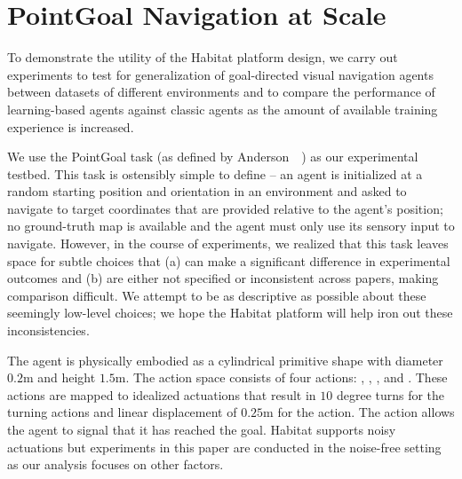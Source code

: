 \section{PointGoal Navigation at Scale}

To demonstrate the utility of the Habitat platform design, we carry out experiments to test for generalization of goal-directed visual navigation agents between datasets of different environments and to compare the performance of learning-based agents against classic agents as the amount of available training experience is increased.

We use the PointGoal task (as defined by Anderson~\etal~\cite{Anderson2018-Evaluation}) as our 
experimental testbed. This task is ostensibly simple to define -- 
an agent is initialized at a random starting position and 
orientation in an environment and asked to navigate to target coordinates that are provided relative to the agent's position; 
no ground-truth map is available and the agent must only use
its sensory input to navigate. 
However, in the course of experiments, we realized that 
this 
task leaves space for
subtle choices that (a) can make a significant difference in 
experimental outcomes and (b) are either not specified 
or inconsistent across papers, making comparison difficult. 
We attempt to be as descriptive as possible about these 
seemingly low-level choices; we hope the Habitat platform will help iron out these inconsistencies. 

The agent is physically embodied as a cylindrical primitive shape with diameter $0.2\text{m}$ and height $1.5\text{m}$.
The action space consists of four actions: \turnleft, \turnright, \forward, and \callstop.
These actions are mapped to idealized actuations that result in $10$ degree turns for the turning actions and linear displacement of $0.25\text{m}$ for the \forward action. 
The \callstop action allows the agent to signal that it has reached the goal.
Habitat supports noisy actuations but experiments in this paper are conducted in the noise-free setting as our analysis focuses on other factors.

